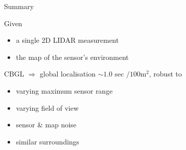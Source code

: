 \begin{frame}[noframenumbering]{Summary}

\begin{overlayarea}{\textwidth}{3cm}
  Given
  \begin{itemize}
    \item a single 2D LIDAR measurement
    \item the map of the sensor's environment
  \end{itemize}

  CBGL $\Rightarrow$ global localisation $\sim 1.0$ sec $ / 100 \text{m}^2$, robust to

  \begin{itemize}
    \item varying maximum sensor range
    \item varying field of view
    \item sensor \& map noise
    \item similar surroundings
  \end{itemize}

\end{overlayarea}
\end{frame}
